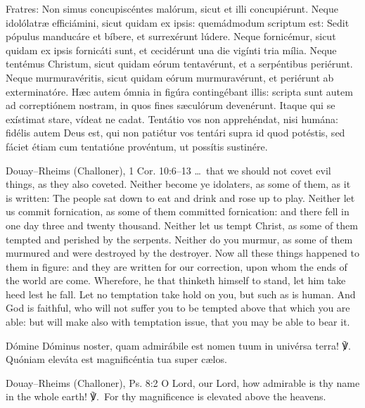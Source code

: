 Fratres: Non simus concupiscéntes malórum, sicut et illi concupiérunt. Neque
idolólatræ efficiámini, sicut quidam ex ipsis: quemádmodum scriptum est:
Sedit pópulus manducáre et bíbere, et surrexérunt lúdere. Neque fornicémur,
sicut quidam ex ipsis fornicáti sunt, et cecidérunt una die vigínti tria
mília. Neque tentémus Christum, sicut quidam eórum tentavérunt, et a
serpéntibus periérunt. Neque murmuravéritis, sicut quidam eórum
murmuravérunt, et periérunt ab exterminatóre. Hæc autem ómnia in figúra
contingébant illis: scripta sunt autem ad correptiónem nostram, in quos fines
sæculórum devenérunt. Itaque qui se exístimat stare, vídeat ne cadat.
Tentátio vos non apprehéndat, nisi humána: fidélis autem Deus est, qui non
patiétur vos tentári supra id quod potéstis, sed fáciet étiam cum tentatióne
provéntum, ut possítis sustinére.
\finishfulltextelement
\begin{fulltextenglish}{Douay--Rheims (Challoner), 1 Cor. 10:6--13}
\dots\ that we should not covet evil things, as they also coveted. Neither
become ye idolaters, as some of them, as it is written: The people sat down to
eat and drink and rose up to play. Neither let us commit fornication, as some
of them committed fornication: and there fell in one day three and twenty
thousand. Neither let us tempt Christ, as some of them tempted and perished by
the serpents. Neither do you murmur, as some of them murmured and were
destroyed by the destroyer. Now all these things happened to them in figure:
and they are written for our correction, upon whom the ends of the world are
come. Wherefore, he that thinketh himself to stand, let him take heed lest he
fall. Let no temptation take hold on you, but such as is human. And God is
faithful, who will not suffer you to be tempted above that which you are able:
but will make also with temptation issue, that you may be able to bear it.
\end{fulltextenglish}

Dómine Dóminus noster, quam admirábile est nomen tuum in univérsa terra!
\textnormal{℣.} Quóniam eleváta est magnificéntia tua super cælos.
\finishfulltextelement
\begin{fulltextenglish}{Douay--Rheims (Challoner), Ps. 8:2}
O Lord, our Lord, how admirable is thy name in the whole earth! ℣.~For thy
magnificence is elevated above the heavens.
\end{fulltextenglish}

